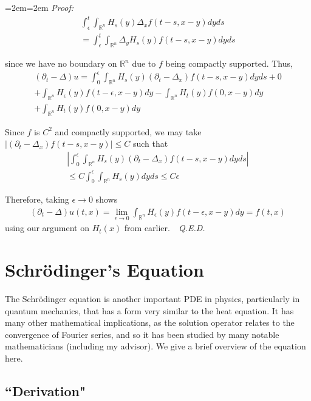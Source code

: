 \documentclass{article}
\newcommand{\R}{{\mathbb{R}}}
\newcommand{\pd}{\partial}
\newenvironment{pf}{%
	\par%
	\medskip
	\leftskip=2em\rightskip=2em%
	\noindent\ignorespaces \textit{Proof:} \newline}{%
	\,\, \newline \textit{Q.E.D.}\par\medskip}
\begin{document}
\begin{pf}
		\begin{align*}
			\int_{\epsilon}^{t} \int_{\R^{n}} H_{s}(y) \Delta_{x}f(t-s,x-y) dyds \\
			= \int_{\epsilon}^{t} \int_{\R^{n}} \Delta_{y} H_{s}(y) f(t-s,x-y) dyds
		\end{align*}
		
		since we have no boundary on $\R^{n}$ due to $f$ being compactly supported. Thus, 
		\begin{align*}
			(\pd_{t} - \Delta )u = \int_{0}^{\epsilon} \int_{\R^{n}} H_{s}(y) (\pd_{t} - \Delta_{x})f(t-s,x-y)dyds + 0 \\
			+ \int_{\R^{n}} H_{\epsilon}(y)f(t-\epsilon,x-y)dy - \int_{\R^{n}} H_{t}(y)f(0,x-y) dy \\  + \int_{\R^{n}} H_{t}(y) f (0,x-y) dy 
		\end{align*}
		
		Since $f$ is $C^{2}$ and compactly supported, we may take $|(\pd_{t} - \Delta_{x})f(t-s,x-y)| \leq C$ such that 
		\begin{align*}
			|\int_{0}^{\epsilon} \int_{\R^{n}} H_{s}(y) (\pd_{t} - \Delta_{x})f(t-s,x-y)dyds| \\
			\leq C \int_{0}^{\epsilon} \int_{\R^{n}} H_{s}(y) dyds \leq C \epsilon
		\end{align*}
		
		Therefore, taking $\epsilon \to 0$ shows 
		\begin{align*}
			(\pd_{t} - \Delta)u(t,x) = \lim_{\epsilon \to 0} \int_{\R^{n}} H_{\epsilon}(y)f(t-\epsilon,x-y)dy = f(t,x)
		\end{align*}
		using our argument on $H_{t}(x)$ from earlier. 
	\end{pf}
	
	
	
	
	
	\section{Schr{\"o}dinger's Equation}
	
	The Schr{\"o}dinger equation is another important PDE in physics, particularly in quantum mechanics, that has a form very similar to the heat equation. It has many other mathematical implications, as the solution operator relates to the convergence of Fourier series, and so it has been studied by many notable mathematicians (including my advisor). We give a brief overview of the equation here.
	
	\subsection{``Derivation"}
	
\end{document}
